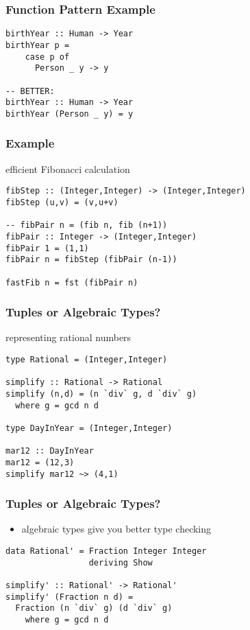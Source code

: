 \documentclass[dvipsnames]{beamer}
\theoremstyle{plain}
\begin{document}
\begin{frame}[fragile]
  \frametitle{Function Pattern Example}

  \begin{lstlisting}
birthYear :: Human -> Year
birthYear p =
    case p of
      Person _ y -> y

-- BETTER:
birthYear :: Human -> Year
birthYear (Person _ y) = y
  \end{lstlisting}
\end{frame}

\begin{frame}[fragile]
  \frametitle{Example}

  \begin{exampleblock}{efficient Fibonacci calculation}
    \begin{lstlisting}
fibStep :: (Integer,Integer) -> (Integer,Integer)
fibStep (u,v) = (v,u+v)

-- fibPair n = (fib n, fib (n+1))
fibPair :: Integer -> (Integer,Integer)
fibPair 1 = (1,1)
fibPair n = fibStep (fibPair (n-1))

fastFib n = fst (fibPair n)
    \end{lstlisting}
  \end{exampleblock}
\end{frame}

\begin{frame}[fragile]
  \frametitle{Tuples or Algebraic Types?}

  \begin{exampleblock}{representing rational numbers}
    \begin{lstlisting}
type Rational = (Integer,Integer)

simplify :: Rational -> Rational
simplify (n,d) = (n `div` g, d `div` g)
  where g = gcd n d

type DayInYear = (Integer,Integer)

mar12 :: DayInYear
mar12 = (12,3)
simplify mar12 ~> (4,1)
    \end{lstlisting}
  \end{exampleblock}
\end{frame}

\begin{frame}[fragile]
  \frametitle{Tuples or Algebraic Types?}

  \begin{itemize}
    \item algebraic types give you better type checking
  \end{itemize}

  \bigskip
  \begin{lstlisting}
data Rational' = Fraction Integer Integer
                 deriving Show

simplify' :: Rational' -> Rational'
simplify' (Fraction n d) =
  Fraction (n `div` g) (d `div` g)
    where g = gcd n d
  \end{lstlisting}
\end{frame}
\end{document}
